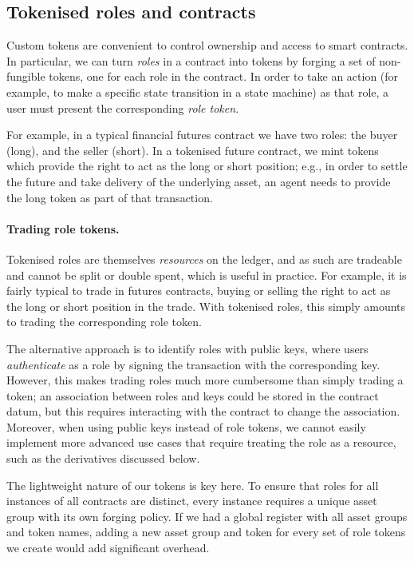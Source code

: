 \subsection{Tokenised roles and contracts}

Custom tokens are convenient to control ownership and access to smart contracts. In particular, we can turn \emph{roles} in a contract into tokens by forging a set of non-fungible tokens, one for each role in the contract. In order to take an action (for example, to make a specific state transition in a state machine) as that role, a user must present the corresponding \emph{role token}.

For example, in a typical financial futures contract we have two roles: the buyer (long), and the seller (short).
In a tokenised future contract, we mint tokens which provide the right to act as the long or short position; e.g., in order to settle the future and take delivery of the underlying asset, an agent needs to provide the long token as part of that transaction.

\paragraph{Trading role tokens.}
%
Tokenised roles are themselves \emph{resources} on the ledger, and as such are tradeable and cannot be split or double spent,
which is useful in practice.
For example, it is fairly typical to trade in futures contracts, buying or selling the right to act as the long or short position in the trade.
With tokenised roles, this simply amounts to trading the corresponding role token.

The alternative approach is to identify roles with public keys, where users \emph{authenticate} as a role by signing the transaction with the corresponding key.
However, this makes trading roles much more cumbersome than simply trading a token;
an association between roles and keys could be stored in the contract datum, but this requires interacting with the contract to change the association.
Moreover, when using public keys instead of role tokens, we cannot easily implement more advanced use cases that require treating the role as a resource, such as the derivatives discussed below.

The lightweight nature of our tokens is key here.
To ensure that roles for all instances of all contracts are distinct, every instance  requires a unique asset group with its own forging policy.
If we had a global register with all asset groups and token names, adding a new asset group and token for every set of role tokens we create would add significant overhead.

